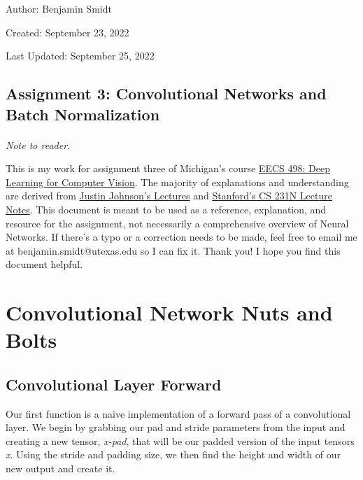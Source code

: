 \documentclass[12pt]{article}
\begin{document}
\noindent Author: Benjamin Smidt

\noindent Created: September 23, 2022

\noindent Last Updated: September 25, 2022
\begin{center}
\section*{Assignment 3: Convolutional Networks and Batch Normalization}
\end{center}

\paragraph{} \emph{Note to reader.} 

This is my work for assignment three of Michigan's course
\href{https://web.eecs.umich.edu/~justincj/teaching/eecs498/WI2022/}
{EECS 498: Deep Learning for Computer Vision}. The majority of explanations and understanding are 
derived from \href{https://www.youtube.com/watch?v=dJYGatp4SvA&list=PL5-TkQAfAZFbzxjBHtzdVCWE0Zbhomg7r&index=1}
{Justin Johnson's Lectures} and \href{http://cs231n.stanford.edu/schedule.html}{Stanford's CS 231N Lecture Notes}.
This document is meant to be used as a reference, 
explanation, and resource for the assignment, not necessarily a comprehensive overview
of Neural Networks. If there's a typo or a correction needs to be made, feel free to 
email me at benjamin.smidt@utexas.edu so I can fix it. Thank you! I hope you find this 
document helpful.

\newpage
\tableofcontents{}

\newpage

\section{Convolutional Network Nuts and Bolts}

\subsection{Convolutional Layer Forward}
Our first function is a naive implementation of a forward pass of a convolutional 
layer. We begin by grabbing our pad and stride parameters from the input and creating a 
new tensor, \emph{x-pad}, that will be our padded version of the input tensors \emph{x}. 
Using the stride and padding size, we then find the height and width of our new output 
and create it. 
\end{document}
